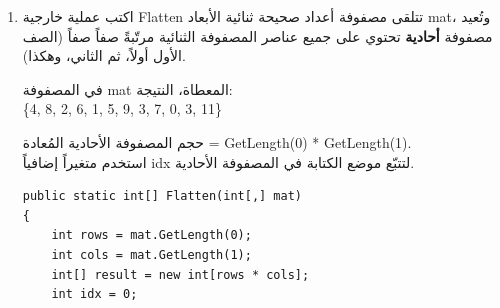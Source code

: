 \documentclass[14pt]{extarticle}
\begin{document}
\begin{enumerate}[itemsep=2em]
\begin{boxExample}
في المصفوفة \textenglish{\{\{1,2,3\},\{4,5,6\},\{1,2,3\}\}}:
\begin{itemize}[itemsep=1pt]
    \item \textenglish{AreRowsEqual(mat, 0, 2)} تُعيد \textenglish{true}
    \item \textenglish{AreRowsEqual(mat, 0, 1)} تُعيد \textenglish{false}
\end{itemize}
\end{boxExample}

\ifwithsols
\begin{boxSolution}
\begin{boxCode}
\begin{english}
\begin{verbatim}
public static bool AreRowsEqual(int[,] mat, int r1, int r2)
{
    for (int j = 0; j < mat.GetLength(1); j++)
        if (mat[r1, j] != mat[r2, j])
            return false;
    return true;
}
\end{verbatim}
\end{english}
\end{boxCode}
\textbf{الشرح:} حالما نجد اختلافاً بين عنصرَين في نفس العمود نُعيد \textenglish{false} فوراً. إذا انتهت الحلقة بدون اختلاف نُعيد \textenglish{true}.
\end{boxSolution}
\fi
\clearpage

\item
اكتب عملية خارجية \textenglish{Flatten} تتلقى مصفوفة أعداد صحيحة ثنائية الأبعاد \textenglish{mat}، وتُعيد مصفوفة \textbf{أحادية} تحتوي على جميع عناصر المصفوفة الثنائية مرتّبةً صفاً صفاً (الصف الأول أولاً، ثم الثاني، وهكذا).

\begin{boxExample}
في المصفوفة \textenglish{mat} المعطاة، النتيجة: \\
\textenglish{\{4, 8, 2, 6, 1, 5, 9, 3, 7, 0, 3, 11\}}
\end{boxExample}

\begin{boxHint}
حجم المصفوفة الأحادية المُعادة = \textenglish{GetLength(0) * GetLength(1)}. \\
استخدم متغيراً إضافياً \textenglish{idx} لتتبّع موضع الكتابة في المصفوفة الأحادية.
\end{boxHint}

\ifwithsols
\begin{boxSolution}
\begin{boxCode}
\begin{english}
\begin{verbatim}
public static int[] Flatten(int[,] mat)
{
    int rows = mat.GetLength(0);
    int cols = mat.GetLength(1);
    int[] result = new int[rows * cols];
    int idx = 0;


\end{verbatim}
\end{english}
\end{boxCode}
\end{boxSolution}
\end{enumerate}
\end{document}
